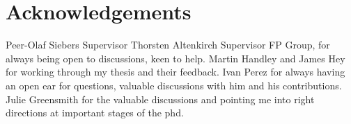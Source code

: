 \chapter*{Acknowledgements}
Peer-Olaf Siebers Supervisor
Thorsten Altenkirch Supervisor
FP Group, for always being open to discussions, keen to help.
Martin Handley and James Hey for working through my thesis and their feedback.
Ivan Perez for always having an open ear for questions, valuable discussions with him and his contributions.
Julie Greensmith for the valuable discussions and pointing me into right directions at important stages of the phd.